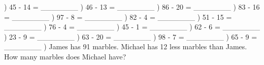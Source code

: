 \documentclass{article}%
\begin{document}
) 45 {-} 14 = \_\_\_\_\_\_\_%
\newline%
\newline%
) 46 {-} 13 = \_\_\_\_\_\_\_%
\newline%
\newline%
) 86 {-} 20 = \_\_\_\_\_\_\_%
\newline%
\newline%
) 83 {-} 16 = \_\_\_\_\_\_\_%
\newline%
\newline%
) 97 {-} 8 = \_\_\_\_\_\_\_%
\newline%
\newline%
) 82 {-} 4 = \_\_\_\_\_\_\_%
\newline%
\newline%
) 51 {-} 15 = \_\_\_\_\_\_\_%
\newline%
\newline%
) 76 {-} 4 = \_\_\_\_\_\_\_%
\newline%
\newline%
) 45 {-} 1 = \_\_\_\_\_\_\_%
\newline%
\newline%
) 62 {-} 6 = \_\_\_\_\_\_\_%
\newline%
\newline%
) 23 {-} 9 = \_\_\_\_\_\_\_%
\newline%
\newline%
) 63 {-} 20 = \_\_\_\_\_\_\_%
\newline%
\newline%
) 98 {-} 7 = \_\_\_\_\_\_\_%
\newline%
\newline%
) 65 {-} 9 = \_\_\_\_\_\_\_%
\newline%
\newline%
) James has 91 marbles. Michael has 12 less marbles than James. How many marbles does Michael have?%
\end{document}
